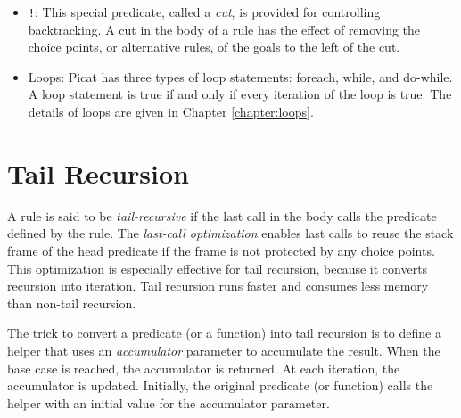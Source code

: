 \begin{itemize}
\item \verb+!+: This special predicate, called a \textit{cut}, is provided for controlling backtracking. A cut in the body of a rule has the effect of removing the choice points, or alternative rules, of the goals to the left of the cut. 

\item Loops: Picat has three types of loop statements: foreach, while, and do-while.  A loop statement is true if and only if every iteration of the loop is true. The details of loops are given in Chapter \ref{chapter:loops}.
\end{itemize}

\section{Tail Recursion}
A rule is said to be \emph{tail-recursive} if the last call in the body calls the predicate defined by the rule. The \emph{last-call optimization} enables last calls to reuse the stack frame of the head predicate if the frame is not protected by any choice points. This optimization is especially effective for tail recursion, because it converts recursion into iteration. Tail recursion runs faster and consumes less memory than non-tail recursion.

The trick to convert a predicate (or a function) into tail recursion is to define a helper that uses an \emph{accumulator} parameter to accumulate the result. When the base case is reached, the accumulator is returned. At each iteration, the accumulator is updated. Initially, the original predicate (or function) calls the helper with an initial value for the accumulator parameter.


